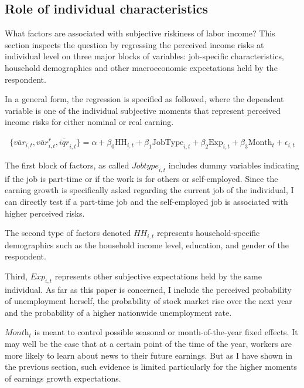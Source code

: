 \documentclass[12pt,notitlepage,onecolumn,aps,pra]{article}
\begin{document}
    \hypertarget{role-of-individual-characteristics}{%
\subsection{Role of individual
characteristics}\label{role-of-individual-characteristics}}

What factors are associated with subjective riskiness of labor income?
This section inspects the question by regressing the perceived income
risks at individual level on three major blocks of variables:
job-specific characteristics, household demographics and other
macroeconomic expectations held by the respondent.

In a general form, the regression is specified as followed, where the
dependent variable is one of the individual subjective moments that
represent perceived income risks for either nominal or real earning.

\begin{eqnarray}
\{\overline{var}_{i,t}, \overline{var}^r_{i,t}, \overline{iqr}_{i,t}\} = \alpha + \beta_0 \textrm{HH}_{i,t} + \beta_1 \textrm{JobType}_{i,t} + \beta_2 \textrm{Exp}_{i,t} + \beta_3 \textrm{Month}_t + \epsilon_{i,t}
\end{eqnarray}

The first block of factors, as called \(\textit{Jobtype}_{i,t}\)
includes dummy variables indicating if the job is part-time or if the
work is for others or self-employed. Since the earning growth is
specifically asked regarding the current job of the individual, I can
directly test if a part-time job and the self-employed job is associated
with higher perceived risks.

The second type of factors denoted \(\textit{HH}_{i,t}\) represents
household-specific demographics such as the household income level,
education, and gender of the respondent.

Third, \(\textit{Exp}_{i,t}\) represents other subjective expectations
held by the same individual. As far as this paper is concerned, I
include the perceived probability of unemployment herself, the
probability of stock market rise over the next year and the probability
of a higher nationwide unemployment rate.

\(\textit{Month}_t\) is meant to control possible seasonal or
month-of-the-year fixed effects. It may well be the case that at a
certain point of the time of the year, workers are more likely to learn
about news to their future earnings. But as I have shown in the previous
section, such evidence is limited particularly for the higher moments of
earnings growth expectations.
\end{document}

